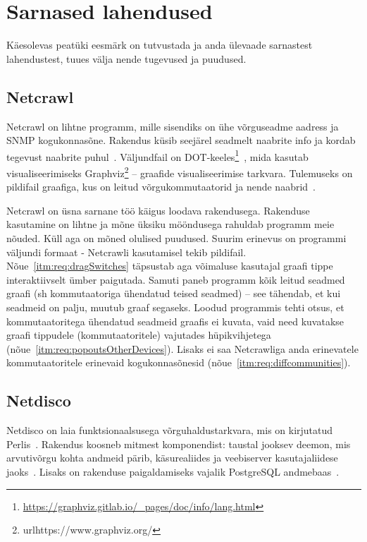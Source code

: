 \documentclass[12pt]{article}
\begin{document}
\newpage
\section{Sarnased lahendused} \label{similar}

Käesolevas peatüki eesmärk on tutvustada ja anda ülevaade sarnastest lahendustest,
tuues välja nende tugevused ja puudused.

\subsection{Netcrawl}
Netcrawl on lihtne programm, mille sisendiks on ühe võrguseadme aadress ja SNMP kogukonnasõne.
Rakendus küsib seejärel seadmelt naabrite info ja kordab tegevust naabrite puhul~\cite{netcrawl}.
Väljundfail on DOT-keeles\footnote{\url{https://graphviz.gitlab.io/_pages/doc/info/lang.html}}~\cite{netcrawl},
mida kasutab visualiseerimiseks Graphviz\footnote{url{https://www.graphviz.org/}} -- graafide
visualiseerimise tarkvara.
Tulemuseks on pildifail graafiga, kus on leitud võrgukommutaatorid ja nende naabrid~\cite{netcrawl}.


Netcrawl on üsna sarnane töö käigus loodava rakendusega.
Rakenduse kasutamine on lihtne ja mõne üksiku mööndusega rahuldab programm meie nõuded.
Küll aga on mõned olulised puudused.
Suurim erinevus on programmi väljundi formaat - Netcrawli kasutamisel tekib pildifail.
Nõue~\ref{itm:req:dragSwitches} täpsustab aga võimaluse kasutajal graafi tippe interaktiivselt
ümber paigutada.
Samuti paneb programm kõik leitud seadmed graafi (sh kommutaatoriga ühendatud teised seadmed) --
see tähendab, et kui seadmeid on palju, muutub graaf segaseks.
Loodud programmis tehti otsus, et kommutaatoritega ühendatud seadmeid graafis ei kuvata, vaid need
kuvatakse graafi tippudele (kommutaatoritele) vajutades
hüpikvihjetega (nõue~\ref{itm:req:popoutsOtherDevices}).
Lisaks ei saa Netcrawliga anda erinevatele kommutaatoritele erinevaid
kogukonnasõnesid (nõue~\ref{itm:req:diffcommunities}).

\subsection{Netdisco}
Netdisco on laia funktsionaalsusega võrguhaldustarkvara, mis on kirjutatud
Perlis~\cite{netdiscoDocs}.
Rakendus koosneb mitmest komponendist: taustal jooksev deemon, mis arvutivõrgu kohta andmeid pärib,
käsurealiides ja veebiserver kasutajaliidese jaoks~\cite{netdiscoDocs}.
Lisaks on rakenduse paigaldamiseks vajalik PostgreSQL andmebaas~\cite{netdiscoDocs}.
\end{document}
